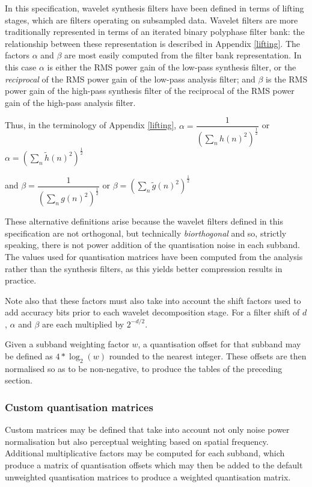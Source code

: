 \begin{informative*}

In this specification, wavelet synthesis filters have been defined in terms of lifting stages,
which are filters operating on subsampled data. Wavelet filters are more traditionally
represented in terms of an iterated binary polyphase filter bank: the relationship between
these representation is described in Appendix \ref{lifting}. The factors $\alpha$ and $\beta$
are most easily computed from the filter bank representation. In this case $\alpha$ is either
the RMS power gain of the low-pass synthesis filter, or the {\em reciprocal} of the RMS power
gain of the low-pass analysis filter; and $\beta$ is the RMS power gain of the high-pass
synthesis filter of the reciprocal of the RMS power gain of the high-pass analysis filter. 

Thus, in the terminology of Appendix \ref{lifting}, 
$\alpha=\dfrac{1}{(\sum_n h(n)^2)^{\frac{1}{2}}}$ or
$\alpha=(\sum_n \tilde{h}(n)^2)^{\frac{1}{2}}$

and
$\beta=\dfrac{1}{(\sum_n g(n)^2)^{\frac{1}{2}}}$ or
$\beta=(\sum_n \tilde{g}(n)^2)^{\frac{1}{2}}$

These alternative definitions arise because the wavelet filters defined in this specification
are not orthogonal, but technically {\em biorthogonal} and so, strictly speaking, there is
not power addition of the quantisation noise in each subband. The values used for quantisation
matrices have been computed from the analysis rather than the synthesis filters, as this yields
better compression results in practice.

Note also that these factors must also take into account the shift factors used to add accuracy 
bits prior to each wavelet decomposition stage. For a filter shift of $d$, $\alpha$ and 
$\beta$ are each multiplied by $2^{-d/2}$.

Given a subband weighting factor $w$, a quantisation offset for that subband may be defined 
as $4*\log_2(w)$ rounded to the nearest integer. These offsets are then normalised so as
to be non-negative, to produce the tables of the preceding section.

\subsubsection{Custom quantisation matrices}
\label{custommatrices}

Custom matrices may be defined that take into account not only noise power normalisation
but also perceptual weighting based on spatial frequency. Additional multiplicative factors
may be computed for each subband, which produce a matrix of quantisation offsets which may
then be added to the default unweighted quantisation matrices to produce a weighted quantisation
matrix.


\end{informative*}
